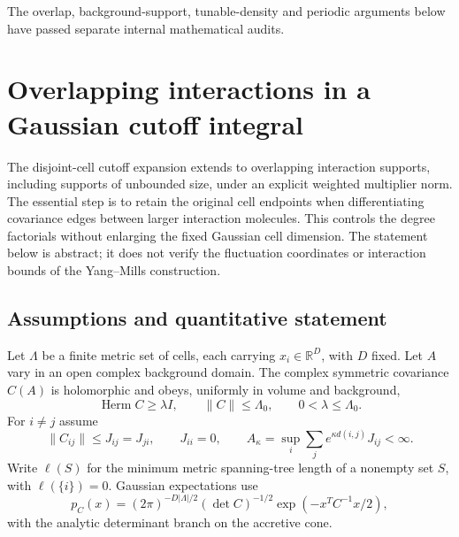\documentclass[11pt]{article}
\theoremstyle{remark}
\begin{document}
The overlap, background-support, tunable-density and periodic
arguments below have passed separate internal mathematical audits.



\section{Overlapping interactions in a Gaussian cutoff integral}
\label{oi-section}

The disjoint-cell cutoff expansion extends to overlapping interaction
supports, including supports of unbounded size, under an explicit
weighted multiplier norm. The essential step is to retain the original
cell endpoints when differentiating covariance edges between larger
interaction molecules. This controls the degree factorials without
enlarging the fixed Gaussian cell dimension. The statement below is
abstract; it does not verify the fluctuation coordinates or interaction
bounds of the Yang--Mills construction.

\subsection{Assumptions and quantitative statement}

Let $\Lambda$ be a finite metric set of cells, each carrying
$x_i\in\mathbb R^D$, with $D$ fixed. Let $A$ vary in an open complex
background domain. The complex symmetric covariance $C(A)$ is
holomorphic and obeys, uniformly in volume and background,
\begin{equation}\label{oi-covariance}
 \operatorname{Herm}C\ge\lambda I,\qquad
 \|C\|\le\Lambda_0,\qquad 0<\lambda\le\Lambda_0.
\end{equation}
For $i\ne j$ assume
\begin{equation}\label{oi-decay}
 \|C_{ij}\|\le J_{ij}=J_{ji},\qquad J_{ii}=0,\qquad
 A_\kappa=\sup_i\sum_j e^{\kappa d(i,j)}J_{ij}<\infty.
\end{equation}
Write $\ell(S)$ for the minimum metric spanning-tree length of a
nonempty set $S$, with $\ell(\{i\})=0$. Gaussian expectations use
\[
 p_C(x)=(2\pi)^{-D|\Lambda|/2}(\det C)^{-1/2}
                     \exp(-x^TC^{-1}x/2),
\]
with the analytic determinant branch on the accretive cone.
\end{document}
